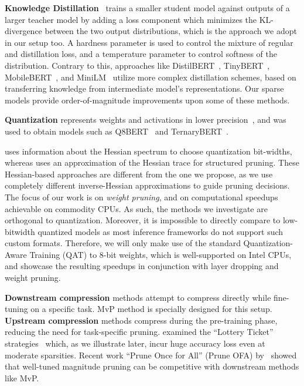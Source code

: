 \documentclass[11pt]{article}
\begin{document}
\noindent\textbf{Knowledge Distillation}~\cite{Hinton2015DistillingTK} trains a smaller student model against outputs of a larger teacher model by adding a loss component which minimizes the KL-divergence between the two output distributions, which is the approach we adopt in our setup too. A hardness parameter is used to control the mixture of regular and distillation loss, and a temperature parameter to control softness of the distribution. Contrary to this, approaches like DistilBERT~\cite{Sanh2019DistilBERTAD}, TinyBERT~\cite{Jiao2020TinyBERTDB}, MobileBERT~\cite{Sun2020MobileBERTAC}, and MiniLM~\cite{Wang2020MiniLMDS} utilize more complex distillation schemes, based on transferring knowledge from intermediate model's representations. Our sparse models provide order-of-magnitude improvements upon some of these methods. 

\noindent\textbf{Quantization} represents weights and activations in lower precision~\cite{Courbariaux2016BinarizedNN}, and was used to obtain models such as Q8BERT~\cite{Zafrir2019Q8BERTQ8} and TernaryBERT~\cite{zhang2020ternarybert}.

\citet{shen2020q} uses information about the Hessian spectrum to choose quantization bit-widths, whereas \citet{yu2022hessian} uses an approximation of the Hessian trace for structured pruning.
These Hessian-based approaches are different from the one we propose, as we use completely different inverse-Hessian approximations to guide pruning decisions. 
The focus of our work is on \emph{weight pruning}, and on computational speedups achievable on commodity CPUs. 
As such, the methods we investigate are orthogonal to quantization. 
Moreover, it is impossible to directly compare to low-bitwidth quantized models as most inference frameworks do not support such custom formats. Therefore, we will only make use of the standard Quantization-Aware Training (QAT) to 8-bit weights, which is well-supported on Intel CPUs, and showcase the resulting speedups in conjunction with layer dropping and weight pruning. 

\noindent\textbf{Downstream compression} methods attempt to compress directly while fine-tuning on a specific task. MvP method is specially designed for this setup. \textbf{Upstream compression} methods compress during the pre-training phase, reducing the need for task-specific pruning. \citet{chen2020lottery} examined the ``Lottery Ticket'' strategies~\cite{Frankle2019TheLT} which, as we illustrate later, incur huge accuracy loss even at moderate sparsities. Recent work ``Prune Once for All'' (Prune OFA) by~\citet{zafrir2021prune} showed that well-tuned magnitude pruning can be competitive with downstream methods like MvP.
\end{document}
